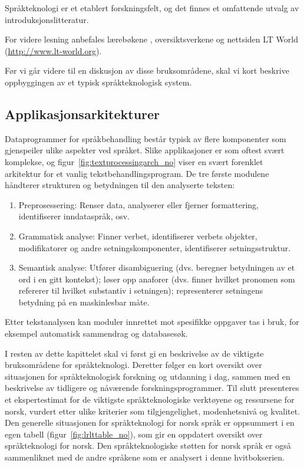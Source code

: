\begin{multicols}{2}
Språkteknologi er et etablert forskningsfelt, og det finnes et omfattende utvalg av introduksjonslitteratur.

For videre lesning anbefales lærebøkene \cite{jurafsky-martin01, manning-schuetze1}, oversiktsverkene \cite{lt-survey1} og nettsiden LT World (\url{http://www.lt-world.org}).

Før vi går videre til en diskusjon av disse bruksområdene, skal vi kort beskrive oppbyggingen av et typisk språkteknologisk system.

\subsection{Applikasjonsarkitekturer}

Dataprogrammer for språkbehandling består typisk av flere komponenter som gjenspeiler ulike aspekter ved språket. Slike applikasjoner er som oftest svært komplekse, og figur~\ref{fig:textprocessingarch_no} viser en svært forenklet arkitektur for et vanlig tekstbehandlingsprogram. De tre første modulene håndterer strukturen og betydningen til den analyserte teksten:

\begin{enumerate}
\item Preprosessering: Renser data, analyserer eller fjerner formattering, identifiserer  inndataspråk, osv.
\item Grammatisk analyse: Finner verbet, identifiserer verbets objekter, modifikatorer og andre setningskomponenter, identifiserer setningsstruktur.
\item Semantisk analyse: Utfører disambiguering (dvs. beregner betydningen av et ord i en gitt kontekst); løser opp anaforer (dvs. finner hvilket pronomen som refererer til hvilket substantiv i setningen); representerer setningens betydning på en maskinlesbar måte.
\end{enumerate}

Etter tekstanalysen kan moduler innrettet mot spesifikke oppgaver tas i bruk, for eksempel automatisk sammendrag og databasesøk. 

I resten av dette kapittelet skal vi først gi en beskrivelse av de viktigste bruksområdene for språkteknologi. Deretter følger en kort oversikt over situasjonen for språkteknologisk forskning og utdanning i dag, sammen med en beskrivelse av tidligere og nåværende forskningsprogrammer. Til slutt presenteres et ekspertestimat for de viktigste språkteknologiske verktøyene og ressursene for norsk, vurdert etter ulike kriterier som tilgjengelighet, modenhetsnivå og kvalitet. Den generelle situasjonen for språkteknologi for norsk språk er oppsummert i en egen tabell (figur~\ref{fig:lrlttable_no}), som gir en oppdatert oversikt over språkteknologi for norsk. Den språkteknologiske støtten for norsk språk er også sammenliknet med de andre språkene som er analysert i denne hvitbokserien.


\end{multicols}
